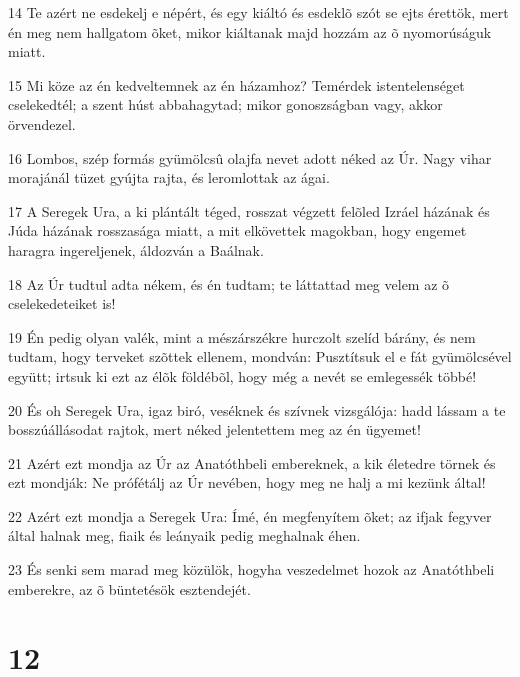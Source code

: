 \par 14 Te azért ne esdekelj e népért, és egy kiáltó és esdeklõ szót se ejts érettök, mert én meg nem hallgatom õket, mikor kiáltanak majd hozzám az õ nyomorúságuk miatt.
\par 15 Mi köze az én kedveltemnek az én házamhoz? Temérdek istentelenséget cselekedtél; a szent húst abbahagytad; mikor gonoszságban vagy, akkor örvendezel.
\par 16 Lombos, szép formás gyümölcsû olajfa nevet adott néked az Úr. Nagy vihar morajánál tüzet gyújta rajta, és leromlottak az ágai.
\par 17 A Seregek Ura, a ki plántált téged, rosszat végzett felõled Izráel házának és Júda házának rosszasága miatt, a mit elkövettek magokban, hogy engemet haragra ingereljenek, áldozván a Baálnak.
\par 18 Az Úr tudtul adta nékem, és én tudtam; te láttattad meg velem az õ cselekedeteiket is!
\par 19 Én pedig olyan valék, mint a mészárszékre hurczolt szelíd bárány, és nem tudtam, hogy terveket szõttek ellenem, mondván: Pusztítsuk el e fát gyümölcsével együtt; irtsuk ki ezt az élõk földébõl, hogy még a nevét se emlegessék többé!
\par 20 És oh Seregek Ura, igaz biró, veséknek és szívnek vizsgálója: hadd lássam a te bosszúállásodat rajtok, mert néked jelentettem meg az én ügyemet!
\par 21 Azért ezt mondja az Úr az Anatóthbeli embereknek, a kik életedre törnek és ezt mondják: Ne  prófétálj az Úr nevében, hogy meg ne halj a mi kezünk által!
\par 22 Azért ezt mondja a Seregek Ura: Ímé, én megfenyítem õket; az ifjak fegyver által halnak meg, fiaik és leányaik pedig meghalnak éhen.
\par 23 És senki sem marad meg közülök, hogyha veszedelmet hozok az Anatóthbeli emberekre, az õ büntetésök esztendejét.

\chapter{12}

